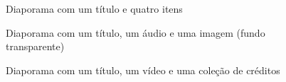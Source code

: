 \documentclass[11pt,a4paper]{report}
\begin{document}
\begin{figure}[H]
\centering
{}
\caption{Diaporama com um título e quatro itens}
\label{img:exemplo3}
\end{figure}

\begin{figure}[H]
\centering
{}
\caption{Diaporama com um título, um áudio e uma imagem (fundo transparente)}
\label{img:exemplo5}
\end{figure}

\begin{figure}[H]
\centering
{}
\caption{Diaporama com um título, um vídeo e uma coleção de créditos}
\label{img:exemplo7}
\end{figure}
\end{document}
